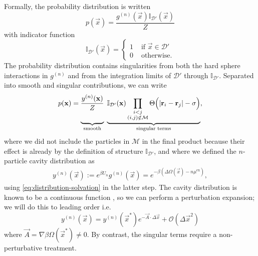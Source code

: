 \documentclass[11pt,twoside]{report}
\begin{document}
Formally, the probability distribution is written
\begin{equation}
  p(\vec{x})
  =
  \frac{g^{(n)}(\vec{x}) \mathbb{I}_{\mathcal{D}'}(\vec{x})}{Z}
\end{equation}
with indicator function%
\begin{equation*}
  \mathbb{I}_{\mathcal{D}'}(\vec{x})
  =
  \begin{cases}
    1 & \textrm{ if } \vec{x} \in \mathcal{D}' \\
    0 & \textrm{ otherwise}.
  \end{cases}
\end{equation*}
The probability distribution contains singularities from both the hard sphere interactions in $g^{(n)}$ and from the integration limits of $\mathcal{D}'$ through $\mathbb{I}_{\mathcal{D}'}$.
Separated into smooth and singular contributions, we can write
\begin{equation*}
  p(\vec{x})
  =
  \underbrace{
    \frac{y^{(n)}(\vec{x})}{Z}
    \vphantom{\prod_{\substack{i < j \\ (i,j) \notin \mathcal{M}}}}
  }_\textrm{smooth}
  \;
  \underbrace{
    \mathbb{I}_{\mathcal{D}'}(\vec{x})
    \prod_{\substack{i < j \\ (i,j) \notin \mathcal{M}}}
    \Theta \Big( |\vec{r}_i - \vec{r}_j| - \sigma \Big)
  }_\textrm{singular terms},
\end{equation*}
where we did not include the particles in $\mathcal{M}$ in the final product because their effect is already by the definition of structure $\mathbb{I}_{\mathcal{D}'}$, and where we defined the $n$-particle cavity distribution as
\begin{equation*}
  \begin{split}
    y^{(n)}(\vec{x})
    :=
    e^{\beta U_n} g^{(n)}(\vec{x}) = e^{-\beta(\Delta\Omega(\vec{x}) - n\mu^\mathrm{ex})},
  \end{split}
\end{equation*}
using \eqref{eq:distribution-solvation} in the latter step.
The cavity distribution is known to be a continuous function \cite{Hansen2013}, so we can perform a perturbation expansion; we will do this to leading order i.e.\
\begin{equation}\label{eq:cavity-perturbation}
  y^{(n)}(\vec{x})
  =
  y^{(n)}(\vec{x}^*) e^{-\vec{A} \cdot \Delta \vec{x}}
  + \mathcal{O}(\Delta \vec{x}^2)
\end{equation}
where $\vec{A} = \nabla \beta\Omega(\vec{x}^*) \ne 0$.
By contrast, the singular terms require a non-perturbative treatment.
\end{document}
